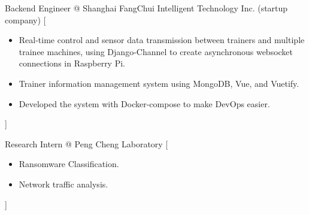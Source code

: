 \documentclass{resume}
\begin{document}
\begin{experiences}
    {Backend Engineer @ Shanghai FangChui Intelligent Technology Inc. (startup company)}%
    [\begin{itemize}
      \item Real-time control and sensor data transmission between trainers and multiple trainee machines, using Django-Channel to create asynchronous websocket connections in Raspberry Pi.
      \item Trainer information management system using MongoDB, Vue, and Vuetify.
      \item Developed the system with Docker-compose to make DevOps easier.
    \end{itemize}]

  \separator{0.5ex}
    {Research Intern @ Peng Cheng Laboratory}%
    [\begin{itemize}
      \item Ransomware Classification.
      \item Network traffic analysis.
    \end{itemize}]
\end{experiences}
\end{document}
